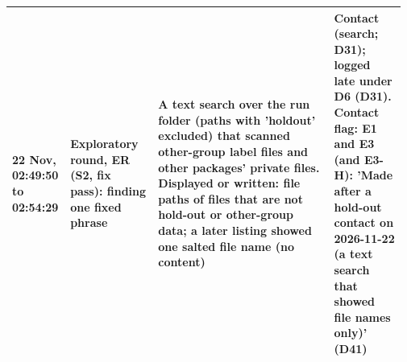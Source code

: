 {\begin{tabular}{@{}p{0.13\linewidth}p{0.22\linewidth}p{0.44\linewidth}p{0.18\linewidth}@{}}
22 Nov, 02:49:50 to 02:54:29 & Exploratory round, ER (S2, fix pass): finding one fixed phrase & A text search over the run folder (paths with 'holdout' excluded) that scanned other-group label files and other packages' private files. Displayed or written: file paths of files that are not hold-out or other-group data; a later listing showed one salted file name (no content) & Contact (search; D31); logged late under D6 (D31). Contact flag: E1 and E3 (and E3-H): 'Made after a hold-out contact on 2026-11-22 (a text search that showed file names only)' (D41) \\
\bottomrule
\end{tabular}}
